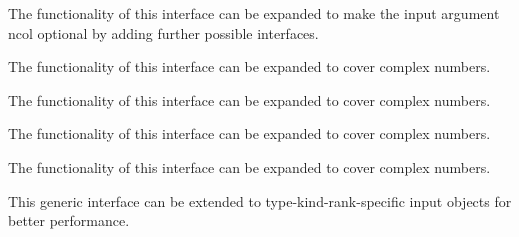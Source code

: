 \begin{DoxyRefList}
%
 The functionality of this interface can be expanded to make the input argument {\ttfamily ncol} optional by adding further possible interfaces. 
\item[Type \mbox{\hyperlink{interfaceMatrixSymmetry__mod_1_1genMatSymFromMatLow}{Matrix\+Symmetry\+\_\+mod\+::gen\+Mat\+Sym\+From\+Mat\+Low}} ]\label{todo__todo000059}%
%
 The functionality of this interface can be expanded to cover complex numbers. 
\item[Type \mbox{\hyperlink{interfaceMatrixSymmetry__mod_1_1genMatSymFromMatUpp}{Matrix\+Symmetry\+\_\+mod\+::gen\+Mat\+Sym\+From\+Mat\+Upp}} ]\label{todo__todo000058}%
%
 The functionality of this interface can be expanded to cover complex numbers. 
\item[Type \mbox{\hyperlink{interfaceMatrixSymmetry__mod_1_1symmetrizeMatLow}{Matrix\+Symmetry\+\_\+mod\+::symmetrize\+Mat\+Low}} ]\label{todo__todo000057}%
%
 The functionality of this interface can be expanded to cover complex numbers. 
\item[Type \mbox{\hyperlink{interfaceMatrixSymmetry__mod_1_1symmetrizeMatUpp}{Matrix\+Symmetry\+\_\+mod\+::symmetrize\+Mat\+Upp}} ]\label{todo__todo000056}%
%
 The functionality of this interface can be expanded to cover complex numbers. 
\item[Type \mbox{\hyperlink{interfaceOption__mod_1_1genopt}{Option\+\_\+mod\+::genopt}} ]\label{todo__todo000060}%
%
 This generic interface can be extended to type-\/kind-\/rank-\/specific input objects for better performance.~\newline
 

\end{DoxyRefList}
